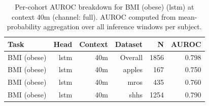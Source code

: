 \begin{table}[ht]
\centering
\caption{Per-cohort AUROC breakdown for BMI (obese) (lstm) at context 40m (channel: full). AUROC computed from mean-probability aggregation over all inference windows per subject.}
\label{tab:cohort_bmi_binary_lstm_full}
\begin{tabular}{lrrrrr}
\toprule
Task & Head & Context & Dataset & N & AUROC \\
\midrule
BMI (obese) & lstm & 40m & Overall & 1856 & 0.798 \\
BMI (obese) & lstm & 40m & apples & 167 & 0.750 \\
BMI (obese) & lstm & 40m & mros & 435 & 0.760 \\
BMI (obese) & lstm & 40m & shhs & 1254 & 0.790 \\
\bottomrule
\end{tabular}
\end{table}